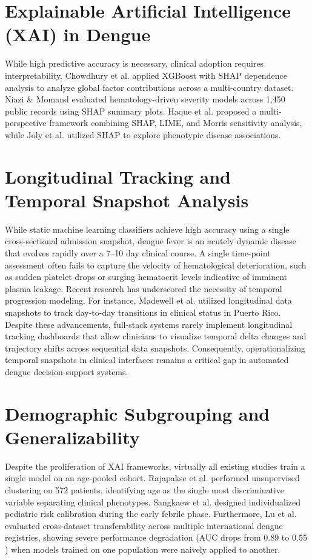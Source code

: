 \documentclass[12pt, a4paper]{report}
\begin{document}
\section{Explainable Artificial Intelligence (XAI) in Dengue}
While high predictive accuracy is necessary, clinical adoption requires interpretability. Chowdhury et al. \cite{chowdhury2022} applied XGBoost with SHAP dependence analysis to analyze global factor contributions across a multi-country dataset. Niazi \& Momand \cite{niazi2026} evaluated hematology-driven severity models across 1,450 public records using SHAP summary plots. Haque et al. \cite{haque2025} proposed a multi-perspective framework combining SHAP, LIME, and Morris sensitivity analysis, while Joly et al. \cite{joly2024} utilized SHAP to explore phenotypic disease associations.

\section{Longitudinal Tracking and Temporal Snapshot Analysis}
While static machine learning classifiers achieve high accuracy using a single cross-sectional admission snapshot, dengue fever is an acutely dynamic disease that evolves rapidly over a 7--10 day clinical course. A single time-point assessment often fails to capture the velocity of hematological deterioration, such as sudden platelet drops or surging hematocrit levels indicative of imminent plasma leakage. Recent research has underscored the necessity of temporal progression modeling. For instance, Madewell et al. \cite{madewell2024} utilized longitudinal data snapshots to track day-to-day transitions in clinical status in Puerto Rico. Despite these advancements, full-stack systems rarely implement longitudinal tracking dashboards that allow clinicians to visualize temporal delta changes and trajectory shifts across sequential data snapshots. Consequently, operationalizing temporal snapshots in clinical interfaces remains a critical gap in automated dengue decision-support systems.

\section{Demographic Subgrouping and Generalizability}
Despite the proliferation of XAI frameworks, virtually all existing studies train a single model on an age-pooled cohort. Rajapakse et al. \cite{rajapakse2014} performed unsupervised clustering on 572 patients, identifying age as the single most discriminative variable separating clinical phenotypes. Sangkaew et al. \cite{sangkaew2026} designed individualized pediatric risk calibration during the early febrile phase. Furthermore, Lu et al. \cite{lu2025} evaluated cross-dataset transferability across multiple international dengue registries, showing severe performance degradation (AUC drops from $0.89$ to $0.55$) when models trained on one population were naively applied to another.
\end{document}
